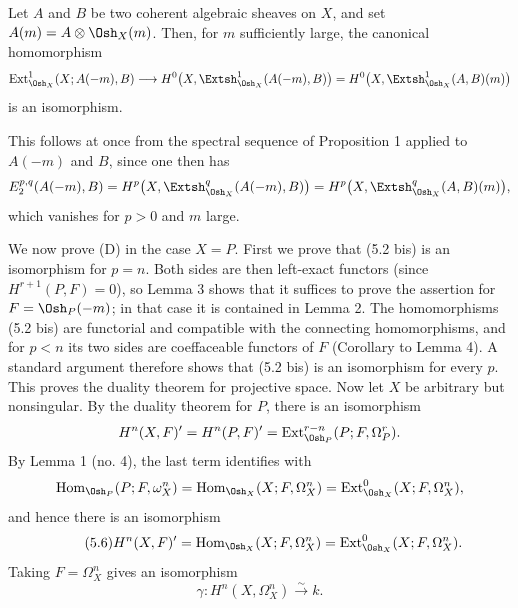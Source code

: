  Let $A$ and $B$ be two coherent algebraic sheaves on $X$, and
set $A(m)=A\otimes\Osh_X(m)$. Then, for $m$ sufficiently large, the canonical
homomorphism
\[
  \operatorname{Ext}_{\Osh_X}^{1}(X;A(-m),B)
  \longrightarrow H^{0}\bigl(X,\Extsh_{\Osh_X}^{1}(A(-m),B)\bigr)
  =H^{0}\bigl(X,\Extsh_{\Osh_X}^{1}(A,B)(m)\bigr)
\]
is an isomorphism.

This follows at once from the spectral sequence of Proposition 1 applied to
$A(-m)$ and $B$, since one then has
\[
  E_{2}^{p,q}(A(-m),B)
  =H^{p}\bigl(X,\Extsh_{\Osh_X}^{q}(A(-m),B)\bigr)
  =H^{p}\bigl(X,\Extsh_{\Osh_X}^{q}(A,B)(m)\bigr),
\]
which vanishes for $p>0$ and $m$ large.

We now prove (D) in the case $X=P$. First we prove that (5.2 bis) is an
isomorphism for $p=n$. Both sides are then left-exact functors (since
$H^{r+1}(P,F)=0$), so Lemma 3 shows that it suffices to prove the assertion for
$F=\Osh_P(-m)$; in that case it is contained in Lemma 2. The homomorphisms
(5.2 bis) are functorial and compatible with the connecting homomorphisms, and
for $p<n$ its two sides are coeffaceable functors of $F$ (Corollary to Lemma 4).
A standard argument therefore shows that (5.2 bis) is an isomorphism for every
$p$. This proves the duality theorem for projective space. Now let $X$ be
arbitrary but nonsingular. By the duality theorem for $P$, there is an
isomorphism
\[
  H^{n}(X,F)'=H^{n}(P,F)'
  =\operatorname{Ext}_{\Osh_P}^{r-n}(P;F,\Omega_P^{r}).
\]
By Lemma 1 (no. 4), the last term identifies with
\[
  \operatorname{Hom}_{\Osh_P}(P;F,\omega_X^{n})
  =\operatorname{Hom}_{\Osh_X}(X;F,\Omega_X^{n})
  =\operatorname{Ext}_{\Osh_X}^{0}(X;F,\Omega_X^{n}),
\]
and hence there is an isomorphism
\begin{equation}\tag{5.6}
  H^{n}(X,F)'=\operatorname{Hom}_{\Osh_X}(X;F,\Omega_X^{n})
  =\operatorname{Ext}_{\Osh_X}^{0}(X;F,\Omega_X^{n}).
\end{equation}
Taking $F=\Omega_X^{n}$ gives an isomorphism
\begin{equation}\tag{5.7}
  \gamma:H^{n}(X,\Omega_X^{n})\xrightarrow{\sim}k.
\end{equation}

